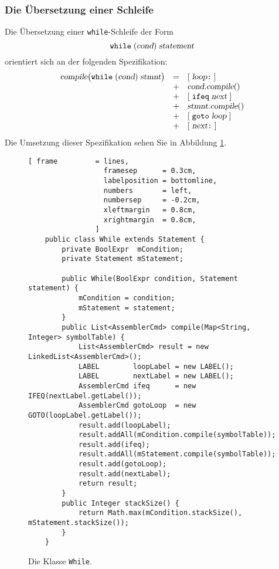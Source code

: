 \subsubsection{Die \"Ubersetzung einer Schleife}
Die \"Ubersetzung einer \texttt{while}-Schleife der Form
\[ \texttt{while}\;(\textsl{cond})\;\textsl{statement} \]
orientiert sich an der folgenden Spezifikation:
\[
   \begin{array}[t]{lcl}
   \textsl{compile}\bigl(\texttt{while}\; (\textsl{cond})\;\textsl{stmnt}\bigr) & = & 
         [\;\textsl{loop}\texttt{:}\;]            \\
   & + & \textsl{cond}.\textsl{compile}()         \\
   & + & [\;\texttt{ifeq}\;\textsl{next}\;] \\
   & + & \textsl{stmnt}.\textsl{compile}()    \\    
   & + & [\;\texttt{goto}\;\textsl{loop}\;]    \\    
   & + & [\;\textsl{next}\texttt{:}\;]         
\end{array}
\]
Die Umsetzung dieser Spezifikation sehen Sie in Abbildung \ref{fig:Statement:While.java}.
 \begin{figure}[!ht]
\centering
\begin{Verbatim}[ frame         = lines, 
                  framesep      = 0.3cm, 
                  labelposition = bottomline,
                  numbers       = left,
                  numbersep     = -0.2cm,
                  xleftmargin   = 0.8cm,
                  xrightmargin  = 0.8cm,
                ]
    public class While extends Statement {
        private BoolExpr  mCondition;
        private Statement mStatement;
    
        public While(BoolExpr condition, Statement statement) {
            mCondition = condition;
            mStatement = statement;
        }
        public List<AssemblerCmd> compile(Map<String, Integer> symbolTable) {
            List<AssemblerCmd> result = new LinkedList<AssemblerCmd>();
            LABEL        loopLabel = new LABEL();
            LABEL        nextLabel = new LABEL();
            AssemblerCmd ifeq      = new IFEQ(nextLabel.getLabel());
            AssemblerCmd gotoLoop  = new GOTO(loopLabel.getLabel());
            result.add(loopLabel);
            result.addAll(mCondition.compile(symbolTable));
            result.add(ifeq);
            result.addAll(mStatement.compile(symbolTable));
            result.add(gotoLoop);
            result.add(nextLabel);
            return result;
        }
        public Integer stackSize() {
            return Math.max(mCondition.stackSize(), mStatement.stackSize());
        }
    }
\end{Verbatim}
\vspace*{-0.3cm}
\caption{Die Klasse \texttt{While}.}
\label{fig:Statement:While.java}
\end{figure}

